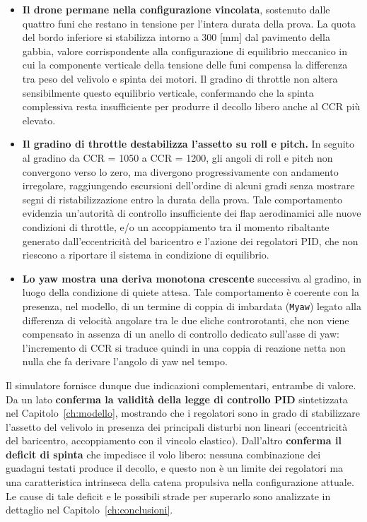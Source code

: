 \documentclass[11pt]{report}
\begin{document}
	\begin{itemize}
		\item \textbf{Il drone permane nella configurazione vincolata}, sostenuto dalle quattro funi che restano in tensione per l'intera durata della prova. La quota del bordo inferiore si stabilizza intorno a 300 [mm] dal pavimento della gabbia, valore corrispondente alla configurazione di equilibrio meccanico in cui la componente verticale della tensione delle funi compensa la differenza tra peso del velivolo e spinta dei motori. Il gradino di throttle non altera sensibilmente questo equilibrio verticale, confermando che la spinta complessiva resta insufficiente per produrre il decollo libero anche al CCR più elevato.

		\item \textbf{Il gradino di throttle destabilizza l'assetto su roll e pitch.} In seguito al gradino da CCR = 1050 a CCR = 1200, gli angoli di roll e pitch non convergono verso lo zero, ma divergono progressivamente con andamento irregolare, raggiungendo escursioni dell'ordine di alcuni gradi senza mostrare segni di ristabilizzazione entro la durata della prova. Tale comportamento evidenzia un'autorità di controllo insufficiente dei flap aerodinamici alle nuove condizioni di throttle, e/o un accoppiamento tra il momento ribaltante generato dall'eccentricità del baricentro e l'azione dei regolatori PID, che non riescono a riportare il sistema in condizione di equilibrio.

		\item \textbf{Lo yaw mostra una deriva monotona crescente} successiva al gradino, in luogo della condizione di quiete attesa. Tale comportamento è coerente con la presenza, nel modello, di un termine di coppia di imbardata (\texttt{Myaw}) legato alla differenza di velocità angolare tra le due eliche controrotanti, che non viene compensato in assenza di un anello di controllo dedicato sull'asse di yaw: l'incremento di CCR si traduce quindi in una coppia di reazione netta non nulla che fa derivare l'angolo di yaw nel tempo.
	\end{itemize}
	
	Il simulatore fornisce dunque due indicazioni complementari, entrambe di valore. Da un lato \textbf{conferma la validità della legge di controllo PID} sintetizzata nel Capitolo~\ref{ch:modello}, mostrando che i regolatori sono in grado di stabilizzare l'assetto del velivolo in presenza dei principali disturbi non lineari (eccentricità del baricentro, accoppiamento con il vincolo elastico). Dall'altro \textbf{conferma il deficit di spinta} che impedisce il volo libero: nessuna combinazione dei guadagni testati produce il decollo, e questo non è un limite dei regolatori ma una caratteristica intrinseca della catena propulsiva nella configurazione attuale. Le cause di tale deficit e le possibili strade per superarlo sono analizzate in dettaglio nel Capitolo~\ref{ch:conclusioni}.
	
\end{document}
